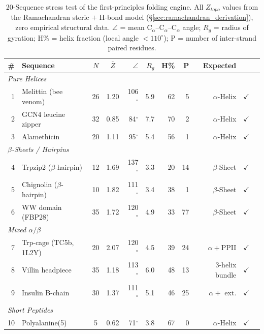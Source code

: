 \begin{table}[H]
\centering
\caption{20-Sequence stress test of the first-principles folding engine.  All $Z_{topo}$ values from the Ramachandran steric $+$ H-bond model (\S\ref{sec:ramachandran_derivation}), zero empirical structural data.  $\angle$ = mean C$_\alpha$--C$_\alpha$--C$_\alpha$ angle; $R_g$ = radius of gyration; H\% = helix fraction (local angle $< 110^\circ$); P = number of inter-strand paired residues.}
\label{tab:stress_test}
\small
\begin{tabular}{@{}r l c c r r r r r c c@{}}
\toprule
\# & \textbf{Sequence} & $N$ & $\bar{Z}$ & $\angle$ & $R_g$ & H\% & P & \textbf{Expected} & \textbf{} \\
\midrule
\multicolumn{10}{l}{\textit{Pure Helices}} \\
1  & Melittin (bee venom)       & 26 & 1.20 & 106$^\circ$ & 5.9 & 62 &  5 & $\alpha$-Helix     & $\checkmark$ \\
2  & GCN4 leucine zipper        & 32 & 0.85 &  84$^\circ$ & 7.7 & 70 &  2 & $\alpha$-Helix     & $\checkmark$ \\
3  & Alamethicin                & 20 & 1.11 &  95$^\circ$ & 5.4 & 56 &  1 & $\alpha$-Helix     & $\checkmark$ \\
\midrule
\multicolumn{10}{l}{\textit{$\beta$-Sheets / Hairpins}} \\
4  & Trpzip2 ($\beta$-hairpin)  & 12 & 1.69 & 137$^\circ$ & 3.3 & 20 & 14 & $\beta$-Sheet      & $\checkmark$ \\
5  & Chignolin ($\beta$-hairpin)& 10 & 1.82 & 111$^\circ$ & 3.4 & 38 &  1 & $\beta$-Sheet      & $\checkmark$ \\
6  & WW domain (FBP28)          & 35 & 1.72 & 120$^\circ$ & 4.9 & 33 & 77 & $\beta$-Sheet      & $\checkmark$ \\
\midrule
\multicolumn{10}{l}{\textit{Mixed $\alpha/\beta$}} \\
7  & Trp-cage (TC5b, 1L2Y)      & 20 & 2.07 & 120$^\circ$ & 4.5 & 39 & 24 & $\alpha + $PPII    & $\checkmark$ \\
8  & Villin headpiece           & 35 & 1.18 & 113$^\circ$ & 6.0 & 48 & 13 & 3-helix bundle     & $\checkmark$ \\
9  & Insulin B-chain            & 30 & 1.37 & 111$^\circ$ & 5.1 & 46 & 25 & $\alpha +$ ext.    & $\checkmark$ \\
\midrule
\multicolumn{10}{l}{\textit{Short Peptides}} \\
10 & Polyalanine(5)             &  5 & 0.62 &  71$^\circ$ & 3.8 & 67 &  0 & $\alpha$-Helix     & $\checkmark$ \\

\end{tabular}
\end{table}
